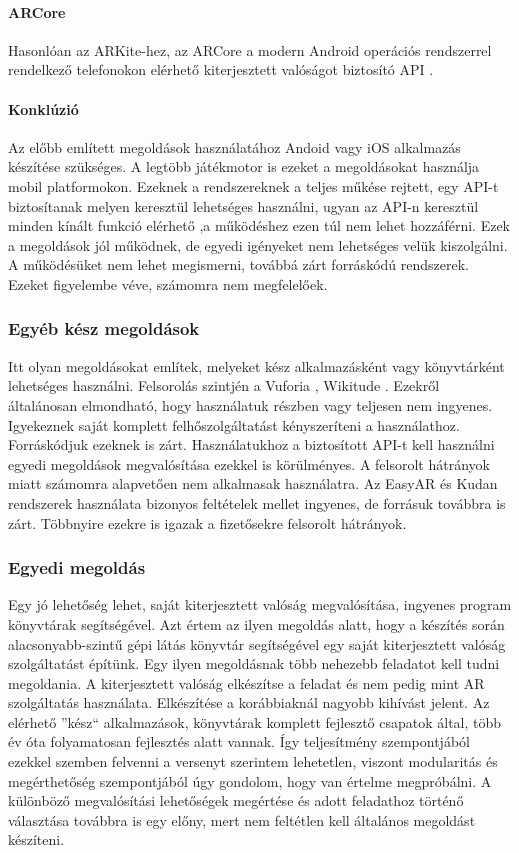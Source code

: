\documentclass[12pt,a4paper,oneside]{report} %
\begin{document}
\paragraph{ARCore}
Hasonlóan az ARKite-hez, az ARCore a modern Android operációs rendszerrel rendelkező telefonokon elérhető kiterjesztett valóságot biztosító API \cite{arcore}.
\paragraph{Konklúzió}
Az előbb említett megoldások használatához Andoid vagy iOS alkalmazás készítése szükséges. A legtöbb játékmotor is ezeket a megoldásokat használja mobil platformokon. Ezeknek a rendszereknek a teljes műkése rejtett, egy API-t biztosítanak melyen keresztül lehetséges használni, ugyan az API-n keresztül minden kínált funkció elérhető ,a működéshez ezen túl nem lehet hozzáférni. Ezek a megoldások jól működnek, de egyedi igényeket nem lehetséges velük kiszolgálni. A működésüket nem lehet megismerni, továbbá zárt forráskódú rendszerek. Ezeket figyelembe véve, számomra nem megfelelőek.
\subsubsection{Egyéb kész megoldások}
Itt olyan megoldásokat említek, melyeket kész alkalmazásként vagy könyvtárként lehetséges használni. Felsorolás szintjén a Vuforia \cite{vuforia}, Wikitude \cite{wikitude}.
Ezekről általánosan elmondható, hogy használatuk részben vagy teljesen nem ingyenes. Igyekeznek saját komplett felhőszolgáltatást kényszeríteni a használathoz. Forráskódjuk ezeknek is zárt. Használatukhoz a biztosított API-t kell használni egyedi megoldások megvalósítása ezekkel is körülményes.  A felsorolt hátrányok miatt számomra alapvetően nem alkalmasak használatra.
Az EasyAR \cite{ezar} és Kudan \cite{kudan} rendszerek használata bizonyos feltételek mellet ingyenes, de forrásuk továbbra is zárt. Többnyire ezekre is igazak a  fizetősekre felsorolt hátrányok.

\subsubsection{Egyedi megoldás}
Egy jó lehetőség lehet, saját kiterjesztett valóság megvalósítása, ingyenes program könyvtárak segítségével.
Azt értem az ilyen megoldás alatt, hogy a készítés során alacsonyabb-szintű gépi látás könyvtár segítségével egy saját kiterjesztett valóság szolgáltatást építünk. Egy ilyen megoldásnak több nehezebb feladatot kell tudni megoldania. A kiterjesztett valóság elkészítse a feladat és nem pedig mint AR szolgáltatás használata. Elkészítése a korábbiaknál nagyobb kihívást jelent. Az elérhető ''kész`` alkalmazások, könyvtárak komplett fejlesztő csapatok által, több év óta folyamatosan fejlesztés alatt vannak. Így teljesítmény szempontjából ezekkel szemben felvenni a versenyt szerintem lehetetlen, viszont modularitás és megérthetőség szempontjából úgy gondolom, hogy van értelme megpróbálni. A különböző megvalósítási lehetőségek megértése és adott feladathoz történő választása továbbra is egy előny, mert nem feltétlen kell általános megoldást készíteni.
\end{document}
